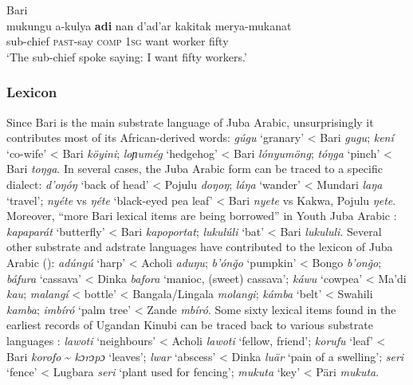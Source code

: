 \documentclass[output=paper]{langsci/langscibook}
\begin{document}
\ea\label{ex:key:}

{Bari \citep[469]{Miller2001}}\\
\gll    mukungu a-kulya \textbf{adi} nan d'ad'ar kakitak merya-mukanat\\
                sub-chief \textsc{past}-say \textsc{comp} 1\textsc{sg} want worker fifty\\
\glt     `The sub-chief spoke saying: I want fifty workers.'
\z


 \subsubsection{Lexicon}

Since Bari is the main substrate language of Juba Arabic, unsurprisingly it contributes most of its African-derived words: \textit{gúgu} ‘granary’ < Bari \textit{gugu}; \textit{kení} ‘co-wife’ < Bari \textit{köyini}; \textit{loɲumég} `hedgehog' < Bari \textit{lónyumöng}; \textit{tóŋga} ‘pinch’ < Bari \textit{toŋga}. In several cases, the Juba Arabic form can be traced to a specific dialect: \textit{d'oŋóŋ} ‘back of head’ < Pojulu \textit{doŋoŋ}; \textit{láŋa} ‘wander’ < Mundari \textit{laŋa} ‘travel’; \textit{nyéte} vs \textit{ŋéte} ‘black-eyed pea leaf’ < Bari \textit{nyete} vs Kakwa, Pojulu \textit{ŋete}. Moreover, “more Bari lexical items are being borrowed” in Youth Juba Arabic \citep[131]{Nakao2012}: \textit{kapaparát} ‘butterfly’ < Bari \textit{kapoportat}; \textit{lukulúli} ‘bat’ < Bari \textit{lukululi}. Several other substrate and adstrate languages have contributed to the lexicon of Juba Arabic (\citealt{Nakao2012,Nakao2015}): \textit{adúngú} ‘harp’ < Acholi \textit{aduŋu}; \textit{b'ónǧ}\textit{o} ‘pumpkin’ < Bongo \textit{b'onǧo}; \textit{báfura} ‘cassava’ < Dinka \textit{bafora} ‘manioc, (sweet) cassava’; \textit{káwu} ‘cowpea’ < Ma'di \textit{kau}; \textit{malangí} < bottle’ < Bangala/Lingala \textit{molangi}; \textit{kámba} ‘belt’ < Swahili \textit{kamba}; \textit{imbíró} ‘palm tree’ < Zande \textit{mbíró}. Some sixty lexical items found in the earliest records of Ugandan Kinubi can be traced back to various substrate languages \citep{Avram2017talk}: \textit{lawoti} ‘neighbours’ < Acholi \textit{lawoti} ‘fellow, friend’; \textit{korufu} ‘leaf’ < Bari \textit{korofo} {\textasciitilde} \textit{kɔrɔ}\textit{pɔ} ‘leaves’; \textit{lwar} ‘abscess’ < Dinka \textit{luär} ‘pain of a swelling’; \textit{seri} ‘fence’ < Lugbara \textit{seri} ‘plant used for fencing’; \textit{mukuta} ‘key’ < Päri \textit{mukuta}.
\end{document}
